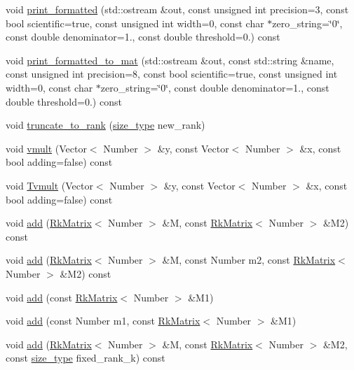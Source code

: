 \begin{DoxyCompactItemize}
\item 
void \hyperlink{classRkMatrix_aeccb86734649be94a64d76cb613eea79}{print\+\_\+formatted} (std\+::ostream \&out, const unsigned int precision=3, const bool scientific=true, const unsigned int width=0, const char $\ast$zero\+\_\+string=\char`\"{}0\char`\"{}, const double denominator=1., const double threshold=0.) const
\item 
void \hyperlink{classRkMatrix_ada4d32bb08cce5d5e41ee4673bc88e00}{print\+\_\+formatted\+\_\+to\+\_\+mat} (std\+::ostream \&out, const std\+::string \&name, const unsigned int precision=8, const bool scientific=true, const unsigned int width=0, const char $\ast$zero\+\_\+string=\char`\"{}0\char`\"{}, const double denominator=1., const double threshold=0.) const
\item 
void \hyperlink{classRkMatrix_a555e0c3184b8411db1350c8fe1e875a0}{truncate\+\_\+to\+\_\+rank} (\hyperlink{classRkMatrix_add060bfc3a4cc77f858c3d6dd58cadd5}{size\+\_\+type} new\+\_\+rank)
\item 
void \hyperlink{classRkMatrix_a25753b7f6d82dca931992cd975165972}{vmult} (Vector$<$ Number $>$ \&y, const Vector$<$ Number $>$ \&x, const bool adding=false) const
\item 
void \hyperlink{classRkMatrix_a7162dd0c4580dbb5e98715d9b8dd56c1}{Tvmult} (Vector$<$ Number $>$ \&y, const Vector$<$ Number $>$ \&x, const bool adding=false) const
\item 
void \hyperlink{classRkMatrix_a260584004c862292b4ae401cff236588}{add} (\hyperlink{classRkMatrix}{Rk\+Matrix}$<$ Number $>$ \&M, const \hyperlink{classRkMatrix}{Rk\+Matrix}$<$ Number $>$ \&M2) const
\item 
void \hyperlink{classRkMatrix_a99413509ad44b1529f20cb018ce0fc70}{add} (\hyperlink{classRkMatrix}{Rk\+Matrix}$<$ Number $>$ \&M, const Number m2, const \hyperlink{classRkMatrix}{Rk\+Matrix}$<$ Number $>$ \&M2) const
\item 
void \hyperlink{classRkMatrix_a8793188eb93def0030ae90e8f5898813}{add} (const \hyperlink{classRkMatrix}{Rk\+Matrix}$<$ Number $>$ \&M1)
\item 
void \hyperlink{classRkMatrix_a93b434797b9142a4dce0c6a64ba1e89c}{add} (const Number m1, const \hyperlink{classRkMatrix}{Rk\+Matrix}$<$ Number $>$ \&M1)
\item 
void \hyperlink{classRkMatrix_ad8668d42978011b3e65d0381bfb068d5}{add} (\hyperlink{classRkMatrix}{Rk\+Matrix}$<$ Number $>$ \&M, const \hyperlink{classRkMatrix}{Rk\+Matrix}$<$ Number $>$ \&M2, const \hyperlink{classRkMatrix_add060bfc3a4cc77f858c3d6dd58cadd5}{size\+\_\+type} fixed\+\_\+rank\+\_\+k) const

\end{DoxyCompactItemize}
